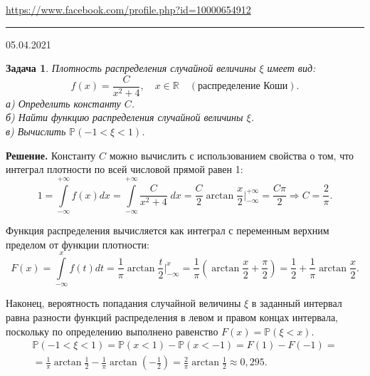 \documentclass[12pt]{article}
\begin{document}


\begin{flushleft}
\url{https://www.facebook.com/profile.php?id=10000654912}
\end{flushleft}
\hrule 
\begin{flushright}
05.04.2021
\end{flushright}
\bigskip


\newtheorem*{task}{Задача}
\begin{task}
Плотность распределения случайной величины $\xi$ имеет вид:
\begin{equation*}
    f(x) = \frac{C}{x^2 + 4}, \quad x \in\mathbb{R} \quad (\text{распределение Коши}).
\end{equation*}
а) Определить константу $C$.\\
б) Найти функцию распределения случайной величины $\xi$.\\
в) Вычислить $\mathbb{P}(-1 < \xi < 1)$.
\end{task}

\noindent\textbf{Решение.} Константу $C$ можно вычислить с использованием свойства о том, что интеграл плотности по всей числовой прямой равен 1:
\begin{equation*}
    1 = \int\limits_{-\infty}^{+\infty} f(x)dx = \int\limits_{-\infty}^{+\infty} \frac{C}{x^2 + 4} \;dx = \frac{C}{2}\arctan{\frac{x}{2}} \bigg|_{-\infty}^{+\infty} = \frac{C\pi}{2} \Rightarrow C = \frac{2}{\pi}.
\end{equation*}

Функция распределения вычисляется как интеграл с переменным верхним пределом от функции плотности:
\begin{equation*}
    F(x) = \int\limits_{-\infty}^{x} f(t)dt = \frac{1}{\pi} \arctan{\frac{t}{2}} \bigg|_{-\infty}^{x} = \frac{1}{\pi} \left(\arctan{\frac{x}{2}} + \frac{\pi}{2}\right) = \frac{1}{2} + \frac{1}{\pi}\arctan{\frac{x}{2}}.
\end{equation*}

Наконец, вероятность попадания случайной величины $\xi$ в заданный интервал равна разности функций распределения в левом и правом концах интервала, поскольку по определению выполнено равенство $F(x) = \mathbb{P}(\xi < x).$
\begin{gather*}
    \mathbb{P}(-1 < \xi < 1) = \mathbb{P}(x < 1) - \mathbb{P}(x < -1) = F(1) - F(-1) = \\ = \frac{1}{\pi} \arctan{\frac{1}{2}} - \frac{1}{\pi}\arctan\left(-\frac{1}{2}\right) = \frac{2}{\pi} \arctan{\frac{1}{2}} \approx 0,295.
\end{gather*}
\end{document}
